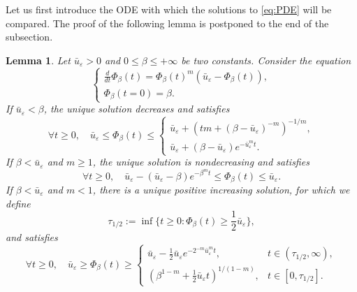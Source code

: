 \documentclass[11pt]{article}
\newtheorem{lemma}[thm]{Lemma}
\numberwithin{equation}{section} %
\newcommand{\ep}{\varepsilon}
\newcommand{\be}{\beta}
\def \hal{\frac{1}{2}}
\def \ep{\varepsilon}
\begin{document}
Let us first introduce the ODE with which the solutions to \eqref{eq:PDE} will be compared. The proof of the following lemma is postponed to the end of the subsection.
\begin{lemma}\label{eq:ODE}
    Let $\bar u_\ep >0$ and $0\le\be \le + \infty$ be two constants. Consider the equation
    \begin{equation*}
    \begin{cases}
         \displaystyle \frac{d}{dt} \Phi_\be(t) = \Phi_\be(t)^m(\bar u_\ep - \Phi_\be(t)), \\
         \Phi_\be(t=0) = \beta.
    \end{cases}
    \end{equation*}
    If $\bar u_\ep <\be$, the unique solution decreases and satisfies
    \begin{equation*}
        \forall t\ge0, \quad \bar u_\ep \le \Phi_{\be}(t) \le \begin{cases}
            \bar u_\ep +  (tm + (\be -\bar u_\ep)^{-m})^{-1/m}, \\
            \bar u_\ep + (\be - \bar u_\ep) e^{-\bar u_\ep^m t}.
        \end{cases}
    \end{equation*}
    If $\be < \bar u_\ep$ and $m\ge 1$, the unique solution is nondecreasing and satisfies
    \begin{equation*}
        \forall t\ge 0, \quad \bar u_\ep - (\bar u_\ep - \be) e^{-\be^m t} \le \Phi_\be(t) \le \bar u_\ep.
    \end{equation*}    
    If $\be < \bar u_\ep$ and $m<1$, there is a unique \emph{positive increasing} solution, for which we define
    \begin{equation*}
        \tau_{1/2} := \inf\{t\ge 0 : \Phi_\be(t) \ge \hal \bar u_\ep \},
    \end{equation*}
    and satisfies
    \begin{equation*}
        \forall t\ge 0, \quad \bar u_\ep \ge \Phi_\be(t) \ge \begin{cases}
            \displaystyle \bar u_\ep - \hal\bar u_\ep e^{-2^{-m}\bar u_\ep^m t}, & t\in (\tau_{1/2},\infty),\\
            \displaystyle (\be^{1-m } + \hal\bar u_\ep t)^{1/(1-m)} ,& t\in [0,\tau_{1/2}].
        \end{cases}
    \end{equation*}
\end{lemma}
\end{document}
